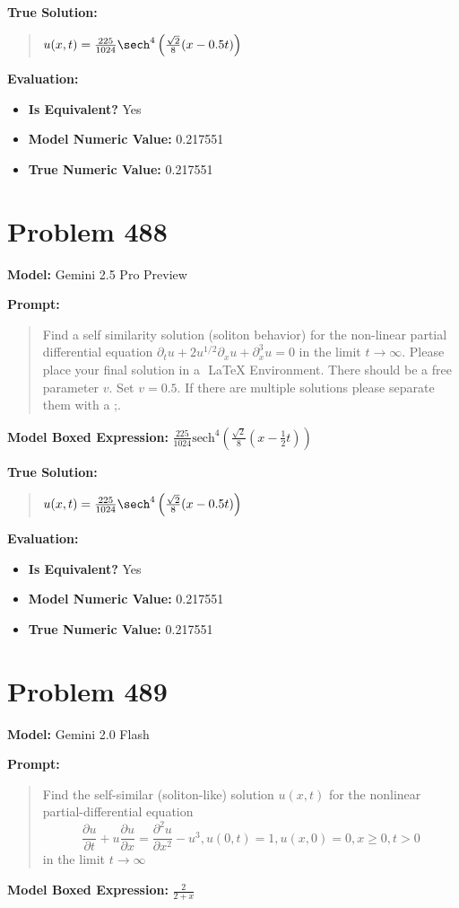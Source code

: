 \documentclass{article}
\begin{document}
\textbf{True Solution:}
\begin{quote}
$u(x,t) = \frac{225}{1024} \sech^4\left( \frac{\sqrt{2}}{8}(x - 0.5t) \right)$
\end{quote}

\textbf{Evaluation:}
\begin{itemize}
\item \textbf{Is Equivalent?} Yes
\item \textbf{Model Numeric Value:} 0.217551
\item \textbf{True Numeric Value:} 0.217551
\end{itemize}
\vspace{1cm}
\section*{Problem 488}
\textbf{Model:} Gemini 2.5 Pro Preview

\textbf{Prompt:}
\begin{quote}
Find a self similarity solution (soliton behavior) for the non-linear partial differential equation $ \partial_t u + 2u^{1/2} \partial_x u + \partial_x^3 u = 0 $ in the limit $t\to\infty$. Please place your final solution in a $\boxed{}$ LaTeX Environment. There should be a free parameter $v$. Set $v=0.5$. If there are multiple solutions please separate them with a ;.
\end{quote}
\textbf{Model Boxed Expression:} $\frac{225}{1024} \text{sech}^4\left(\frac{\sqrt{2}}{8}\left(x-\frac{1}{2}t\right)\right)$

\textbf{True Solution:}
\begin{quote}
$u(x,t) = \frac{225}{1024} \sech^4\left( \frac{\sqrt{2}}{8}(x - 0.5t) \right)$
\end{quote}

\textbf{Evaluation:}
\begin{itemize}
\item \textbf{Is Equivalent?} Yes
\item \textbf{Model Numeric Value:} 0.217551
\item \textbf{True Numeric Value:} 0.217551
\end{itemize}
\vspace{1cm}
\section*{Problem 489}
\textbf{Model:} Gemini 2.0 Flash

\textbf{Prompt:}
\begin{quote}
Find the self-similar (soliton-like) solution $u(x,t)$ for the nonlinear partial-differential equation $$ \frac{\partial u}{\partial t} + u\frac{\partial u}{\partial x} = \frac{\partial^2 u}{\partial x^2} - u^3, u(0,t)=1, u(x,0)=0, x\ge 0, t>0 $$ in the limit $t\to\infty$
\end{quote}
\textbf{Model Boxed Expression:} $\frac{2}{2+x}$
\end{document}
